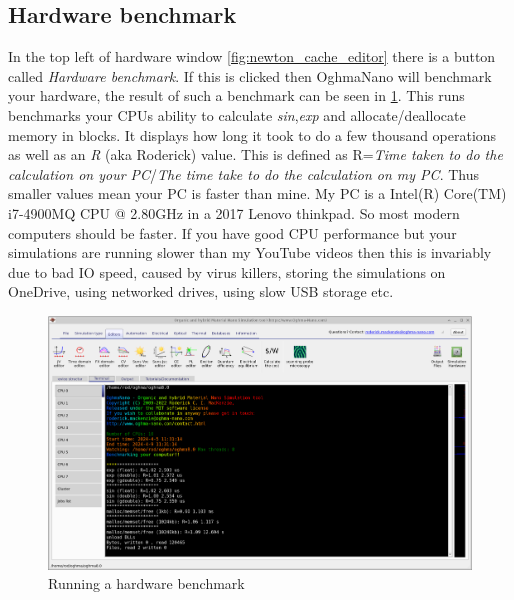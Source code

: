 \subsection{Hardware benchmark}
In the top left of hardware window \ref{fig:newton_cache_editor} there is a button called \emph{Hardware benchmark}. If this is clicked then OghmaNano will benchmark your hardware, the result of such a benchmark can be seen in \ref{fig:hardware_benchmark}. This runs benchmarks your CPUs ability to calculate \emph{sin},\emph{exp} and allocate/deallocate memory in blocks. It displays how long it took to do a few thousand operations as well as an \emph{R} (aka Roderick) value. This is defined as R=\emph{Time taken to do the calculation on your PC}/\emph{The time take to do the calculation on my PC}. Thus smaller values mean your PC is faster than mine. My PC is a Intel(R) Core(TM) i7-4900MQ CPU @ 2.80GHz in a 2017 Lenovo thinkpad. So most modern computers should be faster. If you have good CPU performance but your simulations are running slower than my YouTube videos then this is invariably due to bad IO speed, caused by virus killers, storing the simulations on OneDrive, using networked drives, using slow USB storage etc.

\begin{figure}[H]
\centering
\includegraphics[width=1.0\textwidth,height=0.8\textwidth]{./images/hardware/benchmark.png}
\caption{Running a hardware benchmark}
\label{fig:hardware_benchmark}
\end{figure}


